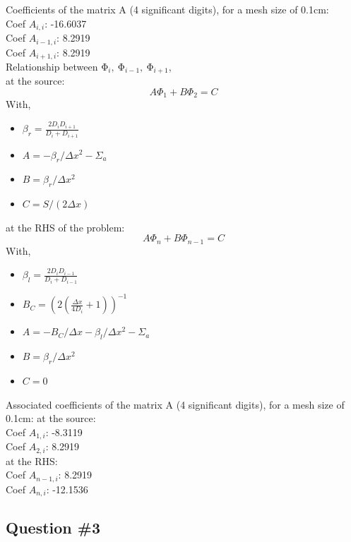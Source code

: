 \documentclass[11pt,a4paper]{article}
\begin{document}
Coefficients of the matrix A (4 significant digits), for a mesh size of 0.1cm:\\
Coef $A_{i,i}$: -16.6037 \\
Coef $A_{i-1,i}$: 8.2919 \\
Coef $A_{i+1,i}$: 8.2919 \\

Relationship between $\mathrm{\Phi}_i,\ \mathrm{\Phi}_{i-1},\ \mathrm{\Phi}_{i+1}$, \\
at the source:
\begin{equation}
    A \Phi_1 + B \Phi_{2} = C
\end{equation}
With,
\begin{itemize}
	\item $\beta_r = \frac{2D_i D_{i+1}}{D_i + D_{i+1}}$
	\item $A = -\beta_r/\Delta x^2 - \Sigma_a$
	\item $B = \beta_r/\Delta x^2$
	\item $C = S/(2 \Delta x)$
\end{itemize}

at the RHS of the problem:
\begin{equation}
    A \Phi_n + B \Phi_{n-1} = C
\end{equation}
With,
\begin{itemize}
	\item $\beta_l = \frac{2D_i D_{i-1}}{D_i + D_{i-1}}$
	\item $B_C = (2(\frac{\Delta x}{4D_i}+1))^{-1}$
	\item $A = -B_C/\Delta x - \beta_l/\Delta x^2 - \Sigma_a$
	\item $B = \beta_r/\Delta x^2$
	\item $C = 0$
\end{itemize}

Associated coefficients of the matrix A (4 significant digits), for a mesh size of 0.1cm:
at the source: \\
Coef $A_{1,i}$: -8.3119 \\
Coef $A_{2,i}$: 8.2919 \\
at the RHS: \\
Coef $A_{n-1,i}$: 8.2919 \\
Coef $A_{n,i}$: -12.1536 \\

\subsection{Question \#3}
\end{document}
